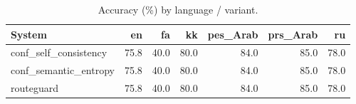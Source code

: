 \begin{table}[t]
\centering
\small
\caption{Accuracy (\%) by language / variant.}
\label{tab:language_breakdown}
\begin{tabular}{lrrrrrr}
\toprule
System & en & fa & kk & pes\_Arab & prs\_Arab & ru \\
\midrule
conf\_self\_consistency & 75.8 & 40.0 & 80.0 & 84.0 & 85.0 & 78.0 \\
conf\_semantic\_entropy & 75.8 & 40.0 & 80.0 & 84.0 & 85.0 & 78.0 \\
routeguard & 75.8 & 40.0 & 80.0 & 84.0 & 85.0 & 78.0 \\
\bottomrule
\end{tabular}
\end{table}

